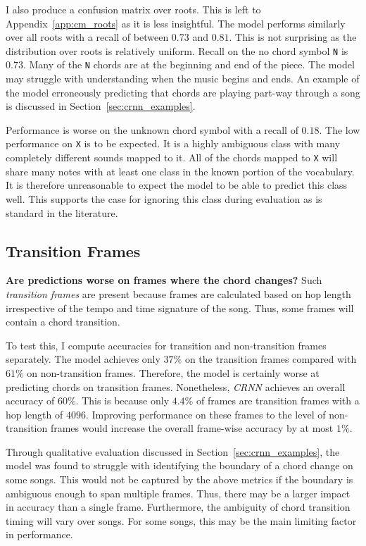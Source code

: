 I also produce a confusion matrix over roots. This is left to Appendix~\ref{app:cm_roots} as it is less insightful. The model performs similarly over all roots with a recall of between $0.73$ and $0.81$. This is not surprising as the distribution over roots is relatively uniform. Recall on the no chord symbol \texttt{N} is $0.73$. Many of the \texttt{N} chords are at the beginning and end of the piece. The model may struggle with understanding when the music begins and ends. An example of the model erroneously predicting that chords are playing part-way through a song is discussed in Section~\ref{sec:crnn_examples}.

Performance is worse on the unknown chord symbol with a recall of $0.18$. The low performance on \texttt{X} is to be expected. It is a highly ambiguous class with many completely different sounds mapped to it. All of the chords mapped to \texttt{X} will share many notes with at least one class in the known portion of the vocabulary. It is therefore unreasonable to expect the model to be able to predict this class well. This supports the case for ignoring this class during evaluation as is standard in the literature.

\subsection{Transition Frames}\label{sec:transition_frames}

\textbf{Are predictions worse on frames where the chord changes?} Such \emph{transition frames} are present because frames are calculated based on hop length irrespective of the tempo and time signature of the song. Thus, some frames will contain a chord transition. 

To test this, I compute accuracies for transition and non-transition frames separately. The model achieves only $37\%$ on the transition frames compared with $61\%$ on non-transition frames. Therefore, the model is certainly worse at predicting chords on transition frames. Nonetheless, \emph{CRNN} achieves an overall accuracy of $60\%$. This is because only $4.4\%$ of frames are transition frames with a hop length of $4096$. Improving performance on these frames to the level of non-transition frames would increase the overall frame-wise accuracy by at most $1\%$. 

Through qualitative evaluation discussed in Section~\ref{sec:crnn_examples}, the model was found to struggle with identifying the boundary of a chord change on some songs. This would not be captured by the above metrics if the boundary is ambiguous enough to span multiple frames. Thus, there may be a larger impact in accuracy than a single frame. Furthermore, the ambiguity of chord transition timing will vary over songs. For some songs, this may be the main limiting factor in performance.

